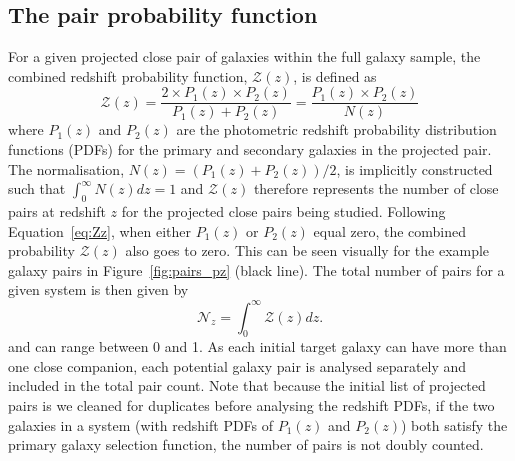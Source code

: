 \subsection{The pair probability function}\label{sec:ppf}
For a given projected close pair of galaxies within the full galaxy sample, the combined redshift probability function, $\mathcal{Z}(z)$, is defined as
\begin{equation}\label{eq:Zz}
\mathcal{Z}(z) = \frac{2 \times P_{1}(z) \times P_{2}(z)}{P_{1}(z) + P_{2}(z)} =
\frac{P_{1}(z) \times P_{2}(z)}{N(z)}
\end{equation}
where $P_{1}(z)$ and $P_{2}(z)$ are the photometric redshift probability distribution functions (PDFs) for the primary and secondary galaxies in the projected pair. The normalisation, \(N(z) = (P_{1}(z) + P_{2}(z))/2\), is implicitly constructed such that \(\int_{0}^{\infty} N(z) dz = 1 \) and $\mathcal{Z}(z)$ therefore represents the number of close pairs at redshift $z$ for the projected close pairs being studied. Following Equation~\ref{eq:Zz}, when either $P_{1}(z)$ or $P_{2}(z)$ equal zero, the combined probability $\mathcal{Z}(z)$ also goes to zero. This can be seen visually for the example galaxy pairs in Figure~\ref{fig:pairs_pz} (black line). The total number of pairs for a given system is then given by
\begin{equation}
	\mathcal{N}_{z} = \int_{0}^{\infty} \mathcal{Z}(z) dz.
\end{equation}
and can range between 0 and 1. As each initial target galaxy can have more than one close companion, each potential galaxy pair is analysed separately and included in the total pair count. Note that because the initial list of projected pairs is we cleaned for duplicates before analysing the redshift PDFs, if the two galaxies in a system (with redshift PDFs of $P_{1}(z)$ and $P_{2}(z)$) both satisfy the primary galaxy selection function, the number of pairs is not doubly counted. 

